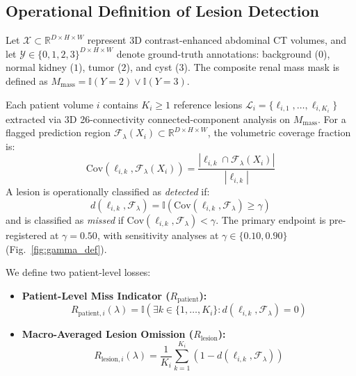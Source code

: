 \documentclass[journal,10pt,twocolumn]{IEEEtran}
\begin{document}
\subsection{Operational Definition of Lesion Detection}
Let $\mathcal{X} \subset \mathbb{R}^{D \times H \times W}$ represent 3D contrast-enhanced abdominal CT volumes, and let $\mathcal{Y} \in \{0, 1, 2, 3\}^{D \times H \times W}$ denote ground-truth annotations: background ($0$), normal kidney ($1$), tumor ($2$), and cyst ($3$). The composite renal mass mask is defined as $M_{\mathrm{mass}} = \mathbb{I}(Y = 2) \lor \mathbb{I}(Y = 3)$.

Each patient volume $i$ contains $K_i \ge 1$ reference lesions $\mathcal{L}_i = \{\ell_{i, 1}, \dots, \ell_{i, K_i}\}$ extracted via 3D 26-connectivity connected-component analysis on $M_{\mathrm{mass}}$. For a flagged prediction region $\mathcal{F}_\lambda(X_i) \subset \mathbb{R}^{D \times H \times W}$, the volumetric coverage fraction is:
\begin{equation}
\mathrm{Cov}\left(\ell_{i, k}, \mathcal{F}_\lambda(X_i)\right) = \frac{\left|\ell_{i, k} \cap \mathcal{F}_\lambda(X_i)\right|}{\left|\ell_{i, k}\right|}
\end{equation}
A lesion is operationally classified as \emph{detected} if:
\begin{equation}
d\left(\ell_{i, k}, \mathcal{F}_\lambda\right) = \mathbb{I}\left(\mathrm{Cov}\left(\ell_{i, k}, \mathcal{F}_\lambda\right) \ge \gamma\right)
\end{equation}
and is classified as \emph{missed} if $\mathrm{Cov}(\ell_{i, k}, \mathcal{F}_\lambda) < \gamma$. The primary endpoint is pre-registered at $\gamma = 0.50$, with sensitivity analyses at $\gamma \in \{0.10, 0.90\}$ (Fig.~\ref{fig:gamma_def}).

We define two patient-level losses:
\begin{itemize}
    \item \textbf{Patient-Level Miss Indicator ($R_{\mathrm{patient}}$):}
    \begin{equation}
    R_{\mathrm{patient}, i}(\lambda) = \mathbb{I}\left(\exists k \in \{1, \dots, K_i\} : d\left(\ell_{i, k}, \mathcal{F}_\lambda\right) = 0\right)
    \end{equation}
    \item \textbf{Macro-Averaged Lesion Omission ($R_{\mathrm{lesion}}$):}
    \begin{equation}
    R_{\mathrm{lesion}, i}(\lambda) = \frac{1}{K_i} \sum_{k=1}^{K_i} \left(1 - d\left(\ell_{i, k}, \mathcal{F}_\lambda\right)\right)
    \end{equation}
\end{itemize}
\end{document}
